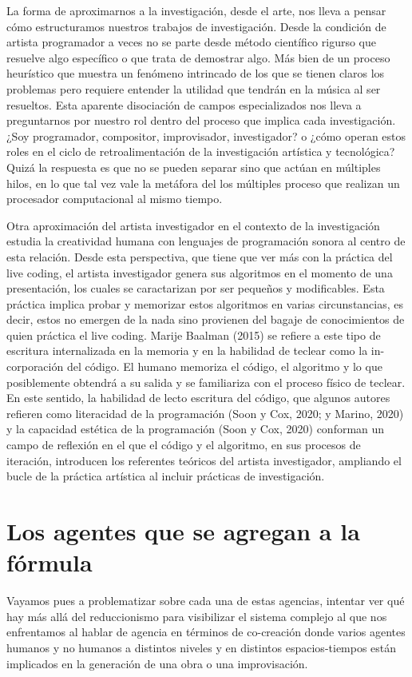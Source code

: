La forma de aproximarnos a la investigación, desde el arte, nos lleva a pensar cómo estructuramos nuestros trabajos de investigación. Desde la condición de artista programador a veces no se parte desde método científico rigurso que resuelve algo específico o que trata de demostrar algo. Más bien de un proceso heurístico que muestra un fenómeno intrincado de los que se tienen claros los problemas pero requiere entender la utilidad que tendrán en la música al ser resueltos. Esta aparente disociación de campos especializados nos lleva a preguntarnos por nuestro rol dentro del proceso que implica cada investigación. ¿Soy programador, compositor, improvisador, investigador? o ¿cómo operan estos roles en el ciclo de retroalimentación de la investigación artística y tecnológica? Quizá la respuesta es que no se pueden separar sino que actúan en múltiples hilos, en lo que tal vez vale la metáfora del los múltiples proceso que realizan un procesador computacional al mismo tiempo.

Otra aproximación del artista investigador en el contexto de la investigación estudia la creatividad humana con lenguajes de programación sonora al centro de esta relación. Desde esta perspectiva, que tiene que ver más con la práctica del live coding, el artista investigador genera sus algoritmos en el momento de una presentación, los cuales se caractarizan por ser pequeños y modificables. Esta práctica implica probar y memorizar estos algoritmos en varias circunstancias, es decir, estos no emergen de la nada sino provienen del bagaje de conocimientos de quien práctica el live coding. Marije Baalman (2015) se refiere a este tipo de escritura internalizada en la memoria y en la habilidad de teclear como la in-corporación del código. El humano memoriza el código, el algoritmo y lo que posiblemente obtendrá a su salida y se familiariza con el proceso físico de teclear. En este sentido, la habilidad de lecto escritura del código, que algunos autores refieren como literacidad de la programación (Soon y Cox, 2020; y Marino, 2020) y la capacidad estética de la programación (Soon y Cox, 2020) conforman un campo de reflexión en el que el código y el algoritmo, en sus procesos de iteración, introducen los referentes teóricos del artista investigador, ampliando el bucle de la práctica artística al incluir prácticas de investigación.

\section{Los agentes que se agregan a la fórmula}
Vayamos pues a problematizar sobre cada una de estas agencias, intentar ver qué hay más allá del reduccionismo para visibilizar el sistema complejo al que nos enfrentamos al hablar de agencia en términos de co-creación donde varios agentes humanos y no humanos a distintos niveles y en distintos espacios-tiempos están implicados en la generación de una obra o una improvisación.

